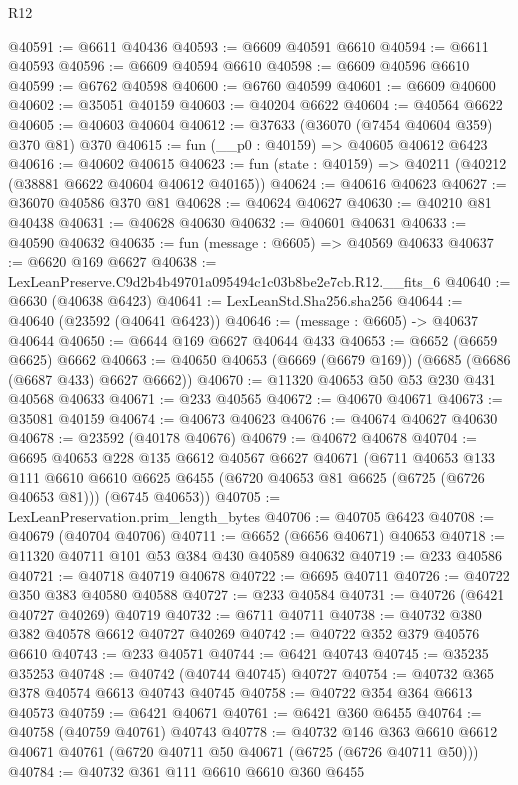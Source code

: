 \begin{lexlean}{R12}
\begin{coremodule}
@40591 := @6611 @40436
@40593 := @6609 @40591 @6610
@40594 := @6611 @40593
@40596 := @6609 @40594 @6610
@40598 := @6609 @40596 @6610
@40599 := @6762 @40598
@40600 := @6760 @40599
@40601 := @6609 @40600
@40602 := @35051 @40159
@40603 := @40204 @6622
@40604 := @40564 @6622
@40605 := @40603 @40604
@40612 := @37633 (@36070 (@7454 @40604 @359) @370 @81) @370
@40615 := fun (__p0 : @40159) => @40605 @40612 @6423
@40616 := @40602 @40615
@40623 := fun (state : @40159) => @40211 (@40212 (@38881 @6622 @40604 @40612 @40165))
@40624 := @40616 @40623
@40627 := @36070 @40586 @370 @81
@40628 := @40624 @40627
@40630 := @40210 @81 @40438
@40631 := @40628 @40630
@40632 := @40601 @40631
@40633 := @40590 @40632
@40635 := fun (message : @6605) => @40569 @40633
@40637 := @6620 @169 @6627
@40638 := LexLeanPreserve.C9d2b4b49701a095494c1c03b8be2e7cb.R12.__fits_6
@40640 := @6630 (@40638 @6423)
@40641 := LexLeanStd.Sha256.sha256
@40644 := @40640 (@23592 (@40641 @6423))
@40646 := (message : @6605) -> @40637 @40644
@40650 := @6644 @169 @6627 @40644 @433
@40653 := @6652 (@6659 @6625) @6662
@40663 := @40650 @40653 (@6669 (@6679 @169)) (@6685 (@6686 (@6687 @433) @6627 @6662))
@40670 := @11320 @40653 @50 @53 @230 @431 @40568 @40633
@40671 := @233 @40565
@40672 := @40670 @40671
@40673 := @35081 @40159
@40674 := @40673 @40623
@40676 := @40674 @40627 @40630
@40678 := @23592 (@40178 @40676)
@40679 := @40672 @40678
@40704 := @6695
    @40653
    @228
    @135
    @6612
    @40567
    @6627
    @40671
    (@6711
      @40653
      @133
      @111
      @6610
      @6610
      @6625
      @6455
      (@6720 @40653 @81 @6625 (@6725 (@6726 @40653 @81)))
      (@6745 @40653))
@40705 := LexLeanPreservation.prim_length_bytes
@40706 := @40705 @6423
@40708 := @40679 (@40704 @40706)
@40711 := @6652 (@6656 @40671) @40653
@40718 := @11320 @40711 @101 @53 @384 @430 @40589 @40632
@40719 := @233 @40586
@40721 := @40718 @40719 @40678
@40722 := @6695 @40711
@40726 := @40722 @350 @383 @40580 @40588
@40727 := @233 @40584
@40731 := @40726 (@6421 @40727 @40269) @40719
@40732 := @6711 @40711
@40738 := @40732 @380 @382 @40578 @6612 @40727 @40269
@40742 := @40722 @352 @379 @40576 @6610
@40743 := @233 @40571
@40744 := @6421 @40743
@40745 := @35235 @35253
@40748 := @40742 (@40744 @40745) @40727
@40754 := @40732 @365 @378 @40574 @6613 @40743 @40745
@40758 := @40722 @354 @364 @6613 @40573
@40759 := @6421 @40671
@40761 := @6421 @360 @6455
@40764 := @40758 (@40759 @40761) @40743
@40778 := @40732
    @146
    @363
    @6610
    @6612
    @40671
    @40761
    (@6720 @40711 @50 @40671 (@6725 (@6726 @40711 @50)))
@40784 := @40732 @361 @111 @6610 @6610 @360 @6455

\end{coremodule}
\end{lexlean}
